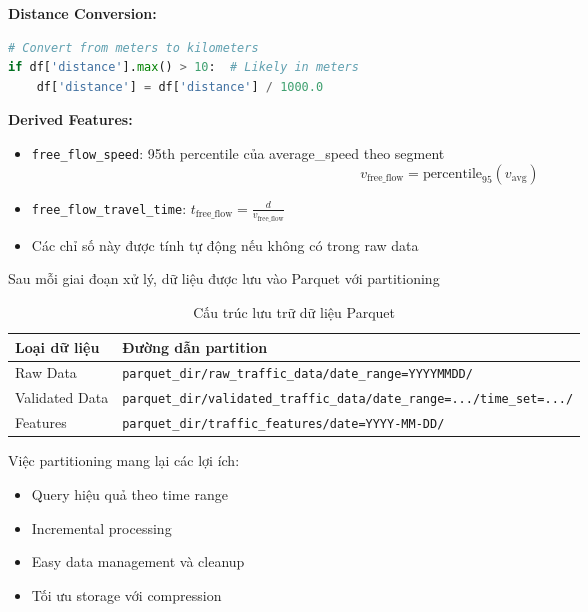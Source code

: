 
\textbf{Distance Conversion:}
\begin{lstlisting}[language=Python, caption={Chuyển đổi đơn vị khoảng cách}]
# Convert from meters to kilometers
if df['distance'].max() > 10:  # Likely in meters
    df['distance'] = df['distance'] / 1000.0
\end{lstlisting}

\textbf{Derived Features:}
\begin{itemize}
    \item \texttt{free\_flow\_speed}: 95th percentile của average\_speed theo segment
    \[
    v_{\text{free\_flow}} = \text{percentile}_{95}(v_{\text{avg}})
    \]
    \item \texttt{free\_flow\_travel\_time}: $t_{\text{free\_flow}} = \frac{d}{v_{\text{free\_flow}}}$
    \item Các chỉ số này được tính tự động nếu không có trong raw data
\end{itemize}


Sau mỗi giai đoạn xử lý, dữ liệu được lưu vào Parquet với partitioning

\begin{table}[h]
\centering
\caption{Cấu trúc lưu trữ dữ liệu Parquet}
\begin{tabular}{|l|l|}
\hline
\textbf{Loại dữ liệu} & \textbf{Đường dẫn partition} \\ \hline
Raw Data & \texttt{parquet\_dir/raw\_traffic\_data/date\_range=YYYYMMDD/} \\ \hline
Validated Data & \texttt{parquet\_dir/validated\_traffic\_data/date\_range=.../time\_set=.../} \\ \hline
Features & \texttt{parquet\_dir/traffic\_features/date=YYYY-MM-DD/} \\ \hline
\end{tabular}
\label{tab:parquet_structure}
\end{table}

Việc partitioning mang lại các lợi ích:
\begin{itemize}
    \item Query hiệu quả theo time range
    \item Incremental processing
    \item Easy data management và cleanup
    \item Tối ưu storage với compression
\end{itemize}

